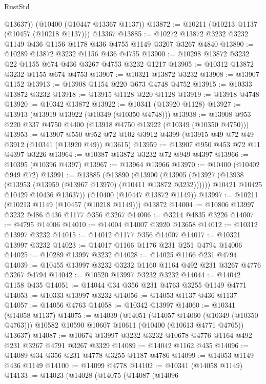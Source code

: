 \begin{lexlean}{RustStd}
\begin{coremodule}
{\begin{coremodule}
{{{{{{{{{{{{{{{{{{{{{{{{{        @13637))
    (@10400 (@10447 @13367 @1137))
@13872 := @10211 (@10213 @1137 (@10457 (@10218 @1137))) @13367
@13885 := @10272 @13872 @3232 @3232 @1149 @436 @1156 @1178 @436 @4755 @1149 @3207 @3267 @4840
@13890 := @10289 @13872 @3232 @1156 @436 @4755
@13900 := @10298 @13872 @3232 @22 @1155 @674 @436 @3267 @4753 @3232 @1217
@13905 := @10312 @13872 @3232 @1155 @674 @4753
@13907 := @10321 @13872 @3232
@13908 := @13907 @1152
@13913 := @13908 @1154 @220 @673 @4748 @4752
@13915 := @10333 @13872 @3232
@13918 := @13915 @1128 @220 @1128
@13919 := @13918 @4748
@13920 := @10342 @13872
@13922 := @10341 (@13920 @1128)
@13927 := @13913 (@13919 @13922 (@10349 (@10350 @4748)))
@13938 := @13908 @953 @220 @337 @4750 @4400 (@13918 @4750 @13922 (@10349 (@10350 @4750)))
@13953 := @13907
    @550
    @952
    @72
    @102
    @3912
    @4399
    (@13915 @49 @72 @49 @3912 (@10341 (@13920 @49)) @13615)
@13959 := @13907 @950 @453 @72 @11 @4397 @3226
@13964 := @10387 @13872 @3232 @72 @949 @4397
@13966 := @10395 (@10396 @4397)
@13967 := @13964 @13966
@13970 := @10400 (@10402 @949 @72)
@13991 := @13885
    (@13890
      (@13900
        (@13905 (@13927 (@13938 (@13953 (@13959 (@13967 @13970) (@10411 @13872 @3232))))))
        @10421
        @10425
        @10429
        @10436
        @13637))
    (@10400 (@10447 @13872 @1149))
@13997 := @10211 (@10213 @1149 (@10457 (@10218 @1149))) @13872
@14004 := @10806 @13997 @3232 @486 @436 @1177 @356 @3267
@14006 := @3214 @4835 @3226
@14007 := @4795 @14006
@14010 := @14004 @14007 @3920 @13658
@14012 := @10312 @13997 @3232
@14015 := @14012 @1177 @356 @14007
@14017 := @10321 @13997 @3232
@14023 := @14017 @1166 @1176 @231 @251 @4794 @14006
@14025 := @10289 @13997 @3232
@14028 := @14025 @1166 @231 @4794
@14039 := @10455 @13997 @3232 @3232 @1160 @1164 @492 @231 @3267 @4776 @3267 @4794
@14042 := @10520 @13997 @3232 @3232
@14044 := @14042 @1158 @435
@14051 := @14044 @34 @356 @231 @4763 @3255 @1149 @4771
@14053 := @10333 @13997 @3232
@14056 := @14053 @1137 @436 @1137
@14057 := @14056 @4763
@14058 := @10342 @13997
@14060 := @10341 (@14058 @1137)
@14075 := @14039
    (@14051
      (@14057 @14060 (@10349 (@10350 @4763)))
      @10582
      @10590
      @10607
      @10611
      (@10400 (@10613 @4771 @4765))
      @13637)
@14087 := @10674 @13997 @3232 @3232 @10678 @4776 @1164 @492 @231 @3267 @4791 @3267 @3329
@14089 := @14042 @1162 @435
@14096 := @14089 @34 @356 @231 @4778 @3255 @1187 @4786
@14099 := @14053 @1149 @436 @1149
@14100 := @14099 @4778
@14102 := @10341 (@14058 @1149)
@14133 := @14023
    (@14028
      (@14075
        (@14087
          (@14096
}}}}}}}}}}}}}}}}}}}}}}}}}
\end{coremodule}}
\end{coremodule}
\end{lexlean}
